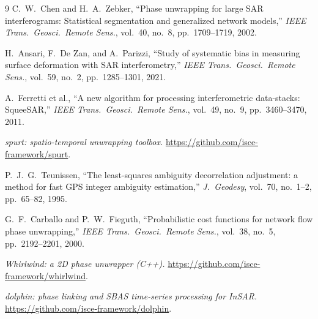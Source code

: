 \documentclass[journal]{IEEEtran}
\begin{document}

\begin{thebibliography}{9}
C.\ W.\ Chen and H.\ A.\ Zebker,
``Phase unwrapping for large SAR interferograms: Statistical segmentation
and generalized network models,''
\emph{IEEE Trans.\ Geosci.\ Remote Sens.}, vol.~40, no.~8,
pp.~1709--1719, 2002.

H.\ Ansari, F.\ De Zan, and A.\ Parizzi,
``Study of systematic bias in measuring surface deformation with SAR
interferometry,''
\emph{IEEE Trans.\ Geosci.\ Remote Sens.}, vol.~59, no.~2,
pp.~1285--1301, 2021.

A.\ Ferretti et al.,
``A new algorithm for processing interferometric data-stacks: SqueeSAR,''
\emph{IEEE Trans.\ Geosci.\ Remote Sens.}, vol.~49, no.~9,
pp.~3460--3470, 2011.

\emph{spurt: spatio-temporal unwrapping toolbox.}
\url{https://github.com/isce-framework/spurt}.

P.\ J.\ G.\ Teunissen,
``The least-squares ambiguity decorrelation adjustment: a method for fast
GPS integer ambiguity estimation,''
\emph{J.\ Geodesy}, vol.~70, no.~1--2, pp.~65--82, 1995.

G.\ F.\ Carballo and P.\ W.\ Fieguth,
``Probabilistic cost functions for network flow phase unwrapping,''
\emph{IEEE Trans.\ Geosci.\ Remote Sens.}, vol.~38, no.~5,
pp.~2192--2201, 2000.

\emph{Whirlwind: a 2D phase unwrapper (C++).}
\url{https://github.com/isce-framework/whirlwind}.

\emph{dolphin: phase linking and SBAS time-series processing for InSAR.}
\url{https://github.com/isce-framework/dolphin}.

\end{thebibliography}
\end{document}
